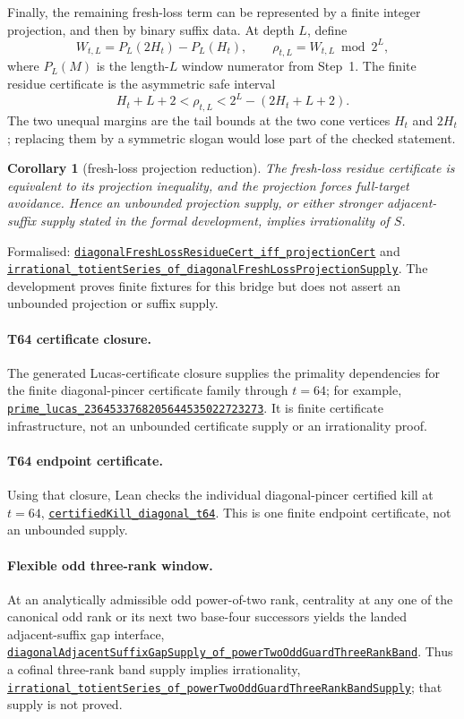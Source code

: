 \documentclass[11pt]{article}
\newcommand{\commit}{81150c1c6fdd4cd51e76d3aa0de344341e0e9e7c}
\newcommand{\repobase}{https://github.com/wcook04/plectis-lean-erdos249-257/blob/\commit}
\newcommand{\PK}{Erdos249257}
\newcommand{\lref}[3]{\href{\repobase/\PK/#1\#L#2}{\nolinkurl{#3}}}
\newcommand{\lrefx}[3]{\href{\repobase/\PK/#1\#L#2}{\nolinkurl{#3}}}
\newtheorem{corollary}[theorem]{Corollary}
\theoremstyle{definition}
\theoremstyle{remark}
\begin{document}
Finally, the remaining fresh-loss term can be represented by a finite integer
projection, and then by binary suffix data.  At depth $L$, define
\[
 W_{t,L}=P_L(2H_t)-P_L(H_t),\qquad
 \rho_{t,L}=W_{t,L}\bmod 2^L,
\]
where $P_L(M)$ is the length-$L$ window numerator from Step~1.  The finite
residue certificate is the asymmetric safe interval
\[
 H_t+L+2<\rho_{t,L}<2^L-(2H_t+L+2).
\]
The two unequal margins are the tail bounds at the two cone vertices $H_t$ and
$2H_t$; replacing them by a symmetric slogan would lose part of the checked
statement.

\begin{corollary}[fresh-loss projection reduction]\label{res:freshloss}
The fresh-loss residue certificate is equivalent to its projection
inequality, and the projection forces full-target avoidance.  Hence an
unbounded projection supply, or either stronger adjacent-suffix supply stated
in the formal development, implies irrationality of $S$.
\end{corollary}
\noindent Formalised:
\lref{DiagonalFreshLossBridge.lean}{61}{diagonalFreshLossResidueCert_iff_projectionCert}
and
\lref{DiagonalFreshLossBridge.lean}{191}{irrational_totientSeries_of_diagonalFreshLossProjectionSupply}.
The development proves finite fixtures for this bridge but does not assert an
unbounded projection or suffix supply.

\paragraph{T64 certificate closure.}\label{res:t64closure}
The generated Lucas-certificate closure supplies the primality dependencies for
the finite diagonal-pincer certificate family through $t=64$; for example,
\lref{DiagonalPincerPrimeCertificates/ClosureT64.lean}{51759}{prime_lucas_2364533768205644535022723273}.
It is finite certificate infrastructure, not an unbounded certificate supply
or an irrationality proof.

\paragraph{T64 endpoint certificate.}\label{res:t64endpoint}
Using that closure, Lean checks the individual diagonal-pincer certified kill
at $t=64$,
\lref{DiagonalPincerCertificateT64Endpoint.lean}{1928}{certifiedKill_diagonal_t64}.
This is one finite endpoint certificate, not an unbounded supply.

\paragraph{Flexible odd three-rank window.}\label{res:flexibleoddwindow}
At an analytically admissible odd power-of-two rank, centrality at any one of
the canonical odd rank or its next two base-four successors yields the landed
adjacent-suffix gap interface,
\lref{DiagonalFlexibleOddWindowSupply.lean}{93}{diagonalAdjacentSuffixGapSupply_of_powerTwoOddGuardThreeRankBand}.
Thus a cofinal three-rank band supply implies irrationality,
\lrefx{DiagonalFlexibleOddWindowSupply.lean}{136}{irrational_totientSeries_of_powerTwoOddGuardThreeRankBandSupply};
that supply is not proved.
\end{document}
